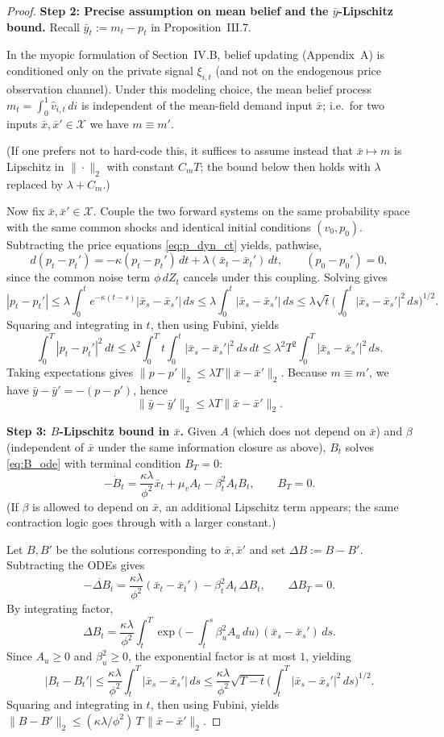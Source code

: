 \begin{proof}
\medskip\noindent
\textbf{Step 2: Precise assumption on mean belief and the $\bar y$-Lipschitz bound.}
Recall $\bar y_t := m_t-p_t$ in Proposition~III.7.

In the myopic formulation of Section~IV.B, belief updating (Appendix~A) is conditioned only on the private signal
$\xi_{i,t}$ (and not on the endogenous price observation channel). Under this modeling choice,
the mean belief process $m_t=\int_0^1\hat v_{i,t}\,di$ is independent of the mean-field demand input $\bar x$; i.e.\ for
two inputs $\bar x,\bar x'\in\mathcal X$ we have $m\equiv m'$.

(If one prefers not to hard-code this, it suffices to assume instead that $\bar x\mapsto m$ is Lipschitz in
$\|\cdot\|_2$ with constant $C_mT$; the bound below then holds with $\lambda$ replaced by $\lambda+C_m$.)

Now fix $\bar x,\bar x'\in\mathcal X$. Couple the two forward systems on the same probability space with the same common
shocks and identical initial conditions $(v_0,p_0)$. Subtracting the price equations \eqref{eq:p_dyn_ct} yields, pathwise,
\[
d(p_t-p_t') = -\kappa(p_t-p_t')\,dt + \lambda(\bar x_t-\bar x_t')\,dt,\qquad (p_0-p_0')=0,
\]
since the common noise term $\phi\,dZ_t$ cancels under this coupling.
Solving gives
\[
|p_t-p_t'|
\le \lambda\int_0^t e^{-\kappa(t-s)}|\bar x_s-\bar x_s'|\,ds
\le \lambda\int_0^t|\bar x_s-\bar x_s'|\,ds
\le \lambda\sqrt{t}\Big(\int_0^t|\bar x_s-\bar x_s'|^2\,ds\Big)^{1/2}.
\]
Squaring and integrating in $t$, then using Fubini, yields
\[
\int_0^T |p_t-p_t'|^2\,dt
\le \lambda^2\int_0^T t\int_0^t|\bar x_s-\bar x_s'|^2\,ds\,dt
\le \lambda^2T^2\int_0^T|\bar x_s-\bar x_s'|^2\,ds.
\]
Taking expectations gives $\|p-p'\|_2\le \lambda T\|\bar x-\bar x'\|_2$.
Because $m\equiv m'$, we have $\bar y-\bar y'=-(p-p')$, hence
\[
\|\bar y-\bar y'\|_2 \le \lambda T\|\bar x-\bar x'\|_2.
\]

\medskip\noindent
\textbf{Step 3: $B$-Lipschitz bound in $\bar x$.}
Given $A$ (which does not depend on $\bar x$) and $\beta$ (independent of $\bar x$ under the same information closure as
above), $B_t$ solves \eqref{eq:B_ode} with terminal condition $B_T=0$:
\[
-\dot B_t=\frac{\kappa\lambda}{\phi^2}\bar x_t+\mu_v A_t-\beta_t^2A_tB_t,\qquad B_T=0.
\]
(If $\beta$ is allowed to depend on $\bar x$, an additional Lipschitz term appears; the same contraction logic goes
through with a larger constant.)

Let $B,B'$ be the solutions corresponding to $\bar x,\bar x'$ and set $\Delta B:=B-B'$.
Subtracting the ODEs gives
\[
-\dot{\Delta B}_t=\frac{\kappa\lambda}{\phi^2}(\bar x_t-\bar x_t')-\beta_t^2A_t\,\Delta B_t,\qquad \Delta B_T=0.
\]
By integrating factor,
\[
\Delta B_t=\frac{\kappa\lambda}{\phi^2}\int_t^T
\exp\!\Big(-\int_t^s \beta_u^2A_u\,du\Big)\,(\bar x_s-\bar x_s')\,ds.
\]
Since $A_u\ge 0$ and $\beta_u^2\ge 0$, the exponential factor is at most $1$, yielding
\[
|B_t-B_t'|
\le \frac{\kappa\lambda}{\phi^2}\int_t^T|\bar x_s-\bar x_s'|\,ds
\le \frac{\kappa\lambda}{\phi^2}\sqrt{T-t}\Big(\int_t^T|\bar x_s-\bar x_s'|^2\,ds\Big)^{1/2}.
\]
Squaring and integrating in $t$, then using Fubini, yields $\|B-B'\|_2 \le (\kappa\lambda/\phi^2)\,T\,\|\bar x-\bar x'\|_2$.


\end{proof}
